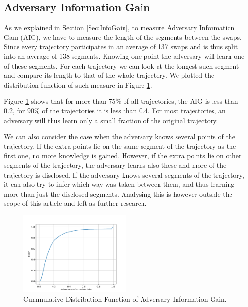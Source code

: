 \subsection{Adversary Information Gain}
\label{sec:reidentification}
As we explained in Section \ref{Sec:InfoGain}, to measure Adversary Information Gain (AIG), we have to measure the 
length of the segments between the swaps. Since every trajectory
participates in an average of 137 swaps and is thus split into an
average of 138 segments. Knowing one point the adversary will learn
one of these segments. 
For each trajectory we can
look at the longest such segment and compare its length to that of the
whole trajectory. We plotted the distribution function of such measure in Figure \ref{fig:ECDF-max-part}. 

Figure \ref{fig:ECDF-max-part} shows that for more than 75\% of all
trajectories, the AIG is less than 0.2, for 90\% of the trajectories it is less
than 0.4. For most trajectories, an adversary will thus learn only a
small fraction of the original trajectory.

We can also consider the case when the adversary knows several points
of the trajectory. If the extra points lie on the same segment of the
trajectory as the first one, no more knowledge is gained. However, if
the extra points lie on other segments of the trajectory, the adversary
learns also these and more of the trajectory is disclosed. If the
adversary knows several segments of the trajectory, it can also try to
infer which way was taken between them, and thus learning more than
just the disclosed segments. Analysing this is however outside the
scope of this article and left as further research.

\begin{figure}
  \center
  \includegraphics[width=0.5\textwidth]{figures/ECDF-max-part.pdf}
  \caption{Cummulative Distribution Function of Adversary Information Gain.}
  \label{fig:ECDF-max-part}
\end{figure}

